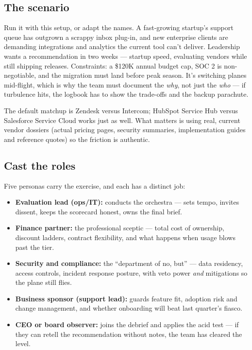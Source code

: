 \subsection{The scenario}


Run it with this setup, or adapt the names. A fast-growing startup's support queue has outgrown a scrappy inbox plug-in, and new enterprise clients are demanding integrations and analytics the current tool can't deliver. Leadership wants a recommendation in two weeks — startup speed, evaluating vendors while still shipping releases. Constraints: a \$120K annual budget cap, SOC 2 is non-negotiable, and the migration must land before peak season. It's switching planes mid-flight, which is why the team must document the \emph{why}, not just the \emph{who} — if turbulence hits, the logbook has to show the trade-offs and the backup parachute.


The default matchup is Zendesk versus Intercom; HubSpot Service Hub versus Salesforce Service Cloud works just as well. What matters is using real, current vendor dossiers (actual pricing pages, security summaries, implementation guides and reference quotes) so the friction is authentic.



\subsection{Cast the roles}


Five personas carry the exercise, and each has a distinct job:


\begin{itemize}[leftmargin=*]
\item \textbf{Evaluation lead (ops/IT):} conducts the orchestra — sets tempo, invites dissent, keeps the scorecard honest, owns the final brief.
\item \textbf{Finance partner:} the professional sceptic — total cost of ownership, discount ladders, contract flexibility, and what happens when usage blows past the tier.
\item \textbf{Security and compliance:} the ``department of no, but'' — data residency, access controls, incident response posture, with veto power \emph{and} mitigations so the plane still flies.
\item \textbf{Business sponsor (support lead):} guards feature fit, adoption risk and change management, and whether onboarding will beat last quarter's fiasco.
\item \textbf{CEO or board observer:} joins the debrief and applies the acid test — if they can retell the recommendation without notes, the team has cleared the level.
\end{itemize}


